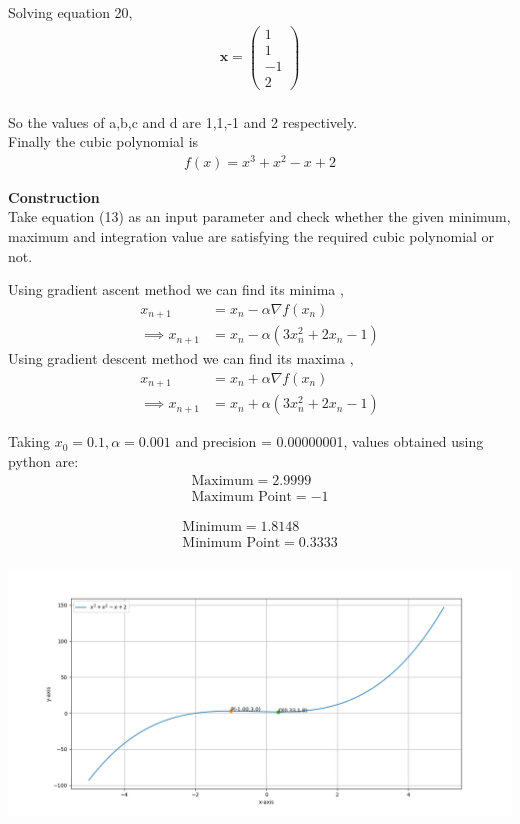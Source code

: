 \documentclass[10pt,a4paper]{report}
\newcommand{\myvec}[1]{\ensuremath{\begin{pmatrix}#1\end{pmatrix}}}
\let\vec\mathbf
\let\vec\mathbf
\providecommand{\brak}[1]{\ensuremath{\left(#1\right)}}
\begin{document}
\begin{multicols}{2}
\begin{align}
\end{align}\\
Solving equation 20,\\
\begin{align}
\vec{x} = \myvec{1\\1\\-1\\2}
\end{align}\\
So the values of a,b,c and d are 1,1,-1 and 2 respectively.\\
Finally the cubic polynomial is\\
\begin{align}
f(x) = x^3 + x^2 - x + 2
\end{align}

\textbf{Construction}\\
Take equation (13) as an input parameter and check whether the given minimum, maximum and integration value are satisfying the required cubic polynomial or not.

Using gradient ascent method we can find its minima ,
    \begin{align}
        x_{n+1} &= x_n - \alpha \nabla f(x_n) \\
        \implies x_{n+1} &= x_n - \alpha \brak{3x^2_n + 2x_n - 1}
    \end{align}
Using gradient descent method we can find its maxima ,
    \begin{align}
        x_{n+1} &= x_n + \alpha \nabla f(x_n) \\
        \implies x_{n+1} &= x_n + \alpha \brak{3x^2_n + 2x_n - 1}
    \end{align}    
    
Taking $x_0=0.1,\alpha=0.001$ and precision = 0.00000001, values obtained using python are:    
    \begin{align}
        \boxed{\text{Maximum} = 2.9999}\\
        \boxed{\text{Maximum Point} = -1}
    \end{align}
     
    \begin{align}
        \boxed{\text{Minimum} = 1.8148}\\
        \boxed{\text{Minimum Point} = 0.3333}
    \end{align}
    \\
 \includegraphics[scale=0.35]{opt.png}  


\end{multicols}
\end{document}
